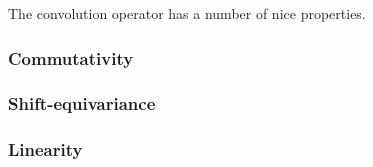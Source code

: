 
The convolution operator has a number of nice properties.

\subsubsection{Commutativity} 

\subsubsection{Shift-equivariance} 

\subsubsection{Linearity} 

